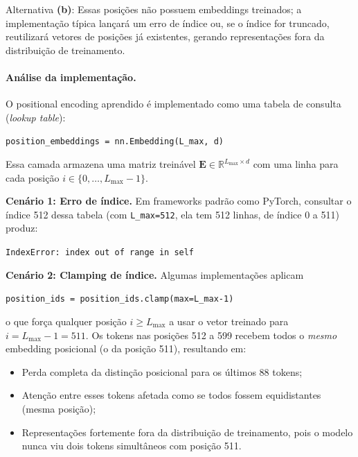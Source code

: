 \documentclass{dlproblemset}
\begin{document}
\begin{respostabox}
Alternativa \textbf{(b)}: Essas posições não possuem embeddings treinados; a
implementação típica lançará um erro de índice ou, se o índice for truncado,
reutilizará vetores de posições já existentes, gerando representações fora da
distribuição de treinamento.
\end{respostabox}

\paragraph{Análise da implementação.}

O positional encoding aprendido é implementado como uma tabela de consulta
(\textit{lookup table}):

\begin{center}
\texttt{position\_embeddings = nn.Embedding(L\_max, d)}
\end{center}

Essa camada armazena uma matriz treinável $\mathbf{E} \in \mathbb{R}^{L_{\max} \times d}$
com uma linha para cada posição $i \in \{0, \ldots, L_{\max}-1\}$.

\textbf{Cenário 1: Erro de índice.}
Em frameworks padrão como PyTorch, consultar o índice 512 dessa tabela
(com \texttt{L\_max=512}, ela tem 512 linhas, de índice 0 a 511) produz:
\begin{center}
\texttt{IndexError: index out of range in self}
\end{center}

\textbf{Cenário 2: Clamping de índice.}
Algumas implementações aplicam
\begin{center}
\texttt{position\_ids = position\_ids.clamp(max=L\_max-1)}
\end{center}
o que força qualquer posição $i \geq L_{\max}$ a usar o vetor treinado para
$i = L_{\max} - 1 = 511$. Os tokens nas posições 512 a 599 recebem todos o
\emph{mesmo} embedding posicional (o da posição 511), resultando em:
\begin{itemize}
  \item Perda completa da distinção posicional para os últimos 88 tokens;
  \item Atenção entre esses tokens afetada como se todos fossem equidistantes
        (mesma posição);
  \item Representações fortemente fora da distribuição de treinamento, pois o
        modelo nunca viu dois tokens simultâneos com posição 511.
\end{itemize}
\end{document}
